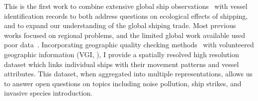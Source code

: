 This is the first work to combine extensive global ship observations~\citep{VOSClim,Tetreault2002} with vessel identification records to both address questions on ecological effects of shipping, and to expand our understanding of the global shiping trade. Most previous works focused on regional problems, and the limited global work available used poor data~\citep{Corbett2007, Halpern2008}. Incorporating geographic quality checking methods~\citep{goodchildli2012} with volunteered geographic information (VGI, \citealp{goodchild2007citizens}), I provide a spatially resolved high resolution dataset which links individual ships with their movement patterns and vessel attributes. This dataset, when aggregated into multiple representations, allows us to answer open questions on topics including noise pollution, ship strikes, and invasive species introduction. 






